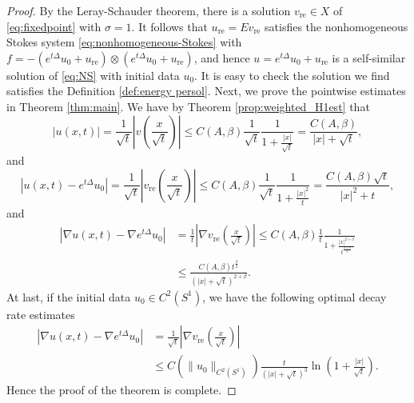 \documentclass[12pt]{amsart}
\numberwithin{equation}{section}              %
\theoremstyle{remark}
\begin{document}
\begin{proof}
			By the Leray-Schauder theorem, there is a solution $v_{\textrm{re}} \in X$ of \eqref{eq:fixedpoint} with $\sigma = 1$. It follows that $ u_{\textrm{re}} =  E v_{\textrm{re}}$ satisfies the nonhomogeneous Stokes system \eqref{eq:nonhomogeneous-Stokes}  with $f = -(e^{t\Delta}u_0 + u_{\textrm{re}}) \otimes (e^{t\Delta}u_0 + u_{\textrm{re}})$, and hence $u = e^{t\Delta} u_0 + u_{\textrm{re}}$ is a self-similar  solution of \eqref{eq:NS} with initial data $u_0$.
			It is easy to check the solution we find satisfies the Definition \ref{def:energy persol}.
			Next, we prove the pointwise estimates in Theorem \ref{thm:main}. We have by Theorem \ref{prop:weighted_H1est} that
			\begin{equation*}
				|u(x,t)| = \frac{1}{\sqrt{t}}\left|v\left(\frac{x}{\sqrt{t}}\right)\right|\le C(A,\beta)\frac{1}{\sqrt{t}}\frac{1}{1+\frac{|x|}{\sqrt{t}}} =\frac{C(A,\beta)}{|x|+\sqrt{t}},
			\end{equation*}
			and
			\begin{equation*}
				|u(x,t)-e^{t\Delta}u_0| = \frac{1}{\sqrt{t}}\left|v_{\textrm{re}}\left(\frac{x}{\sqrt{t}}\right)\right|\le C(A,\beta)\frac{1}{\sqrt{t}}\frac{1}{1+\frac{|x|^2}{t}} =\frac{C(A,\beta)\sqrt{t}}{|x|^2+t},
			\end{equation*}
			and
			\begin{equation*}
				\begin{aligned}
					|\nabla u(x,t)- \nabla e^{t\Delta}u_0| &= \frac{1}{t}\left|\nabla v_{\textrm{re}}\left(\frac{x}{\sqrt{t}}\right)\right|\le C(A,\beta)\frac{1}{t}\frac{1}{1+\frac{|x|^{2+\beta}}{t^{\frac{2+\beta}{2}}}}\\
					&\leq \frac{C(A,\beta)t^{\frac{\beta}{2}}}{(|x|+\sqrt{t})^{2+\beta}}.
				\end{aligned}	
			\end{equation*}
			At last,
			if the initial data $u_0\in C^2(S^1)$, we have the following optimal decay rate estimates
			\begin{equation*}
				\begin{aligned}
					|\nabla u(x,t)- \nabla e^{t\Delta}u_0| &= \frac{1}{\sqrt{t}}\left|\nabla v_{\textrm{re}}\left(\frac{x}{\sqrt{t}}\right)\right|\\
					&\leq C(\|u_0\|_{C^2(S^1)})\frac{t}{(|x|+\sqrt{t})^3}\ln\left(1+\frac{|x|}{\sqrt{t}}\right).
				\end{aligned}	
			\end{equation*}
            Hence the proof of the theorem is complete.
		\end{proof}
		
\end{document}
